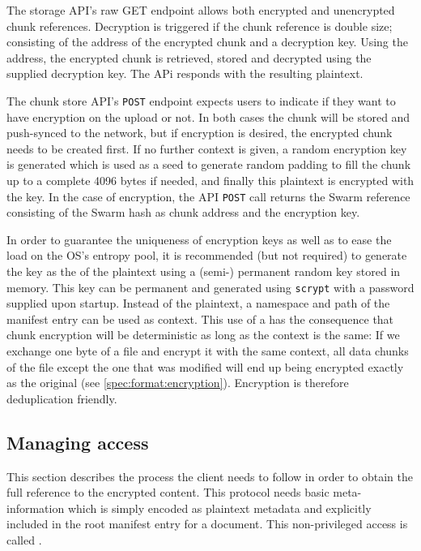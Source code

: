 
The storage API's raw GET endpoint allows both encrypted and unencrypted chunk references. 
Decryption is triggered if the chunk reference is double size; consisting of the address of the encrypted chunk and a decryption key. Using the address, the encrypted chunk is retrieved, stored and decrypted using the supplied decryption key. The APi responds with the resulting plaintext.

The chunk store API's \lstinline{POST} endpoint expects users to indicate if they want to have encryption on the upload or not. In both cases the chunk will be stored and push-synced to the network, but if encryption is desired, the encrypted chunk needs to be created first. If no further context is given, a random encryption key is generated which is used as a seed to generate random padding to fill the chunk up to a complete 4096 bytes if needed, and finally this plaintext is encrypted with the key. In the case of encryption, the API \lstinline{POST} call returns the Swarm reference consisting of the Swarm hash as chunk address and the encryption key. 

In order to guarantee the uniqueness of encryption keys as well as to ease the load on the OS's entropy pool, it is recommended (but not required) to generate the key as the  of the plaintext using a (semi-) permanent random key stored in memory. 
This key can be permanent and generated using \lstinline{scrypt} \cite{percival2009stronger}
with a password supplied upon startup. Instead of the plaintext, a namespace and path of the manifest entry can be used as context.
This use of a  has the consequence that chunk encryption will be deterministic as long as the context is the same: If we exchange one byte of a file and encrypt it with the same context, all data chunks of the file except the one that was modified will end up being encrypted exactly as the original (see \ref{spec:format:encryption}). Encryption is therefore deduplication friendly. 


\subsection{Managing access\statusgreen}\label{sec:managing-access}

This section describes the process the client needs to follow in order to obtain the full reference to the encrypted content. This protocol needs basic meta-information which is simply encoded as plaintext metadata and explicitly included in the root manifest entry for a document. This non-privileged access is called .

